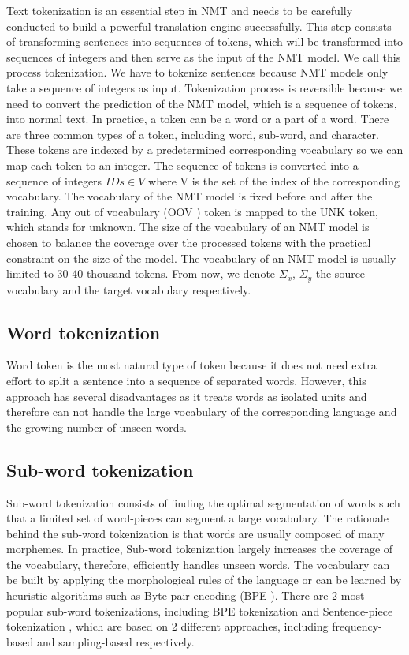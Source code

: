 Text tokenization is an essential step in NMT and needs to be carefully conducted to build a powerful translation engine successfully. This step consists of transforming sentences into sequences of tokens, which will be transformed into sequences of integers and then serve as the input of the NMT model. We call this process tokenization. We have to tokenize sentences because NMT models only take a sequence of integers as input. Tokenization process is reversible because we need to convert the prediction of the NMT model, which is a sequence of tokens, into normal text. In practice, a token can be a word or a part of a word. There are three common types of a token, including word, sub-word, and character. These tokens are indexed by a predetermined corresponding vocabulary so we can map each token to an integer. The sequence of tokens is converted into a sequence of integers $IDs \in V$ where V is the set of the index of the corresponding vocabulary. The vocabulary of the NMT model is fixed before and after the training. Any out of vocabulary (OOV ) token is mapped to the UNK token, which stands for unknown. The size of the vocabulary of an NMT model is chosen to balance the coverage over the processed tokens with the practical constraint on the size of the model. The vocabulary of an NMT model is usually limited to 30-40 thousand tokens. From now, we denote $\Sigma_{x}$, $\Sigma_y$ the source vocabulary and the target vocabulary respectively.    
\subsection{Word tokenization}
Word token is the most natural type of token because it does not need extra effort to split a sentence into a sequence of separated words. However, this approach has several disadvantages as it treats words as isolated units and therefore can not handle the large vocabulary of the corresponding language and the growing number of unseen words.
\subsection{Sub-word tokenization}
Sub-word tokenization consists of finding the optimal segmentation of words such that a limited set of word-pieces can segment a large vocabulary. The rationale behind the sub-word tokenization is that words are usually composed of many morphemes. In practice, Sub-word tokenization largely increases the coverage of the vocabulary, therefore, efficiently handles unseen words. The vocabulary can be built by applying the morphological rules of the language or can be learned by heuristic algorithms such
as Byte pair encoding (BPE )\citep{Sennrich16neural,Mike12japanese,Gage94anew}. There are 2 most popular sub-word tokenizations, including BPE tokenization \citep{Sennrich16neural,Mike12japanese,Gage94anew} and Sentence-piece tokenization \citep{Taku18subword}, which are based on 2 different approaches, including frequency-based and sampling-based respectively.

